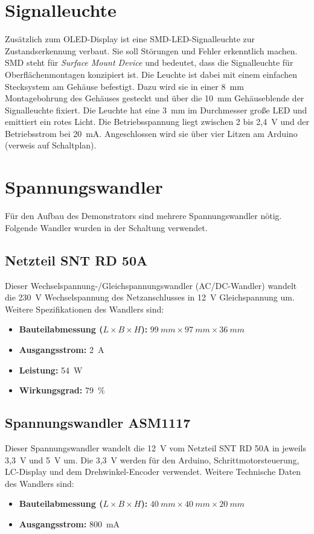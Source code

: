 \section{Signalleuchte}
Zusätzlich zum OLED-Display ist eine SMD-LED-Signalleuchte zur Zustandserkennung verbaut. Sie soll Störungen und Fehler erkenntlich machen. SMD steht für \emph{Surface Mount Device} und bedeutet, dass die Signalleuchte für Oberflächenmontagen konzipiert ist. Die Leuchte ist dabei mit einem einfachen Stecksystem am Gehäuse befestigt. Dazu wird sie in einer 8\ mm Montagebohrung des Gehäuses gesteckt und über die 10\ mm Gehäuseblende der Signalleuchte fixiert. Die Leuchte hat eine 3\ mm im Durchmesser große LED und emittiert ein rotes Licht. Die Betriebsspannung liegt zwischen 2 bis 2,4\ V und der Betriebsstrom bei 20\ mA. Angeschlossen wird sie über vier Litzen am Arduino (verweis auf Schaltplan).\cite{Mentor.2024}

\section{Spannungswandler}
Für den Aufbau des Demonstrators sind mehrere Spannungswandler nötig. Folgende Wandler wurden in der Schaltung verwendet.
\subsection{Netzteil SNT RD 50A}
Dieser Wechselspannung-/Gleichspannungswandler (AC/DC-Wandler) wandelt die 230\ V Wechselspannung des Netzanschlusses in 12\ V Gleichspannung um. %
Weitere Spezifikationen des Wandlers sind:
\begin{itemize}
	\item \textbf{Bauteilabmessung ($L\times B \times H$):} $99 \ mm \times 97 \ mm \times 36 \ mm$
	\item \textbf{Ausgangsstrom:} 2\ A
	\item \textbf{Leistung:} 54\ W
	\item \textbf{Wirkungsgrad:} 79\ \% 
\end{itemize} 
\cite{Meanwell.2019}

\subsection{Spannungswandler ASM1117}
Dieser Spannungswandler wandelt die 12\ V vom Netzteil SNT RD 50A in jeweils 3,3\ V und 5\ V um. Die 3,3\ V werden für den Arduino, Schrittmotorsteuerung, LC-Display und dem Drehwinkel-Encoder verwendet. Weitere Technische Daten des Wandlers sind:
\begin{itemize}
	\item \textbf{Bauteilabmessung ($L\times B \times H$):} $40 \ mm \times 40 \ mm \times 20 \ mm$
	\item \textbf{Ausgangsstrom:} 800\ mA
\end{itemize}
	\cite{AMS.2024}
	
